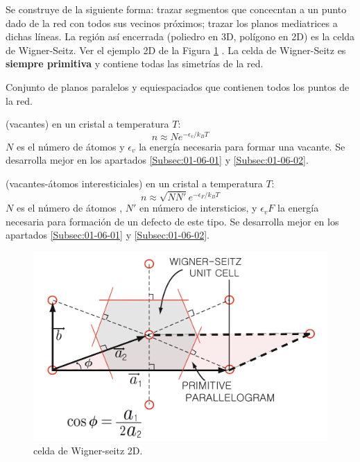 \begin{definition}
    Se construye de la siguiente forma: trazar segmentos que concecntan a un punto dado de la red con todos sus vecinos próximos; trazar los planos mediatrices a dichas líneas. La región así encerrada (poliedro en 3D, polígono en 2D) es la celda de Wigner-Seitz. Ver el ejemplo 2D de la Figura \ref{Fig:01-02} . La celda de Wigner-Seitz es \textbf{siempre primitiva} y contiene todas las simetrías de la red.    
\end{definition}
\begin{definition}
    Conjunto de planos paralelos y equiespaciados que contienen todos los puntos de la red. 
\end{definition}


\begin{definition}
    (vacantes) en un cristal a temperatura $T$:
    \begin{equation}
    n \approx N e^{-\epsilon_v /k_B T}
    \end{equation}
    $N$ es el número de átomos y $\epsilon_v$ la energía necesaria para formar una vacante. Se desarrolla mejor en los apartados \ref{Subsec:01-06-01} y \ref{Subsec:01-06-02}.
\end{definition}


\begin{definition}
    (vacantes-átomos interesticiales) en un cristal a temperatura $T$:
    \begin{equation}
    n \approx \sqrt{NN'} e^{-\epsilon_F /k_B T}
    \end{equation}
    $N$ es el número de átomos , $N'$ en número de intersticios, y $\epsilon_vF$ la energía necesaria para formación de un defecto de este tipo. Se desarrolla mejor en los apartados \ref{Subsec:01-06-01} y \ref{Subsec:01-06-02}.
\end{definition}
    

\begin{figure}[h!] \centering
    \includegraphics[scale=0.29]{Cuerpo/Ch_01/Wigner-seitz_1.png}
    \caption{celda de Wigner-seitz 2D.}
    \label{Fig:01-02}
\end{figure}



